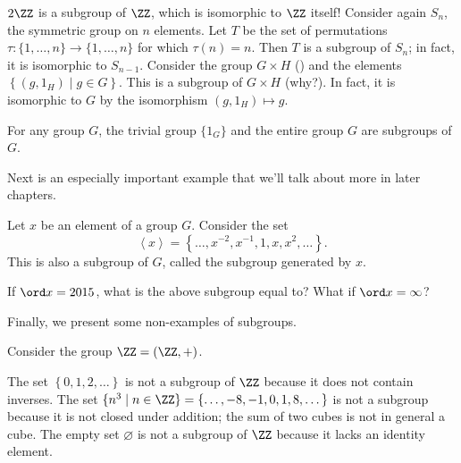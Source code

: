 \begin{example}
	\listhack
	\begin{enumerate}[(a) ]
		\ii $2\ZZ$ is a subgroup of $\ZZ$, which is isomorphic to $\ZZ$ itself!
		\ii Consider again $S_n$, the symmetric group on $n$ elements.
		Let $T$ be the set of permutations $\tau : \{1, \dots, n\} \to \{1, \dots, n\}$
		for which $\tau(n) = n$.  Then $T$ is a subgroup of $S_n$;
		in fact, it is isomorphic to $S_{n-1}$.
		\ii Consider the group $G \times H$ ()
		and the elements $ \left\{ (g, 1_H) \mid g \in G \right\} $.
		This is a subgroup of $G \times H$ (why?).
		In fact, it is isomorphic to $G$
		by the isomorphism $(g,1_H) \mapsto g$.
	\end{enumerate}
\end{example}
\begin{example}
	For any group $G$, the trivial group $\{1_G\}$
	and the entire group $G$ are subgroups of $G$.
\end{example}

Next is an especially important example that we'll talk about more in later chapters.
\begin{example}
	Let $x$ be an element of a group $G$.
	Consider the set
	\[ \left<x\right> = \left\{ \dots, x^{-2}, x^{-1}, 1, x, x^2, \dots \right\}. \]
	This is also a subgroup of $G$, called the subgroup generated by $x$.
\end{example}
\begin{exercise}
	If $\ord x = 2015$, what is the above subgroup equal to?
	What if $\ord x = \infty$?
\end{exercise}

Finally, we present some non-examples of subgroups.
\begin{example}
	Consider the group $\ZZ = (\ZZ, +)$.
	\begin{enumerate}[(a)]
		\ii The set $\left\{ 0,1,2,\dots \right\}$ is
		not a subgroup of $\ZZ$ because it does not contain inverses.
		\ii The set $\{ n^3 \mid n \in \ZZ \}
		= \{ \dots, -8, -1, 0, 1, 8, \dots \}$ is not a subgroup
		because it is not closed under addition;
		the sum of two cubes is not in general a cube.
		\ii The empty set $\varnothing$ is not a subgroup
		of $\ZZ$ because it lacks an identity element.
	\end{enumerate}
\end{example}

